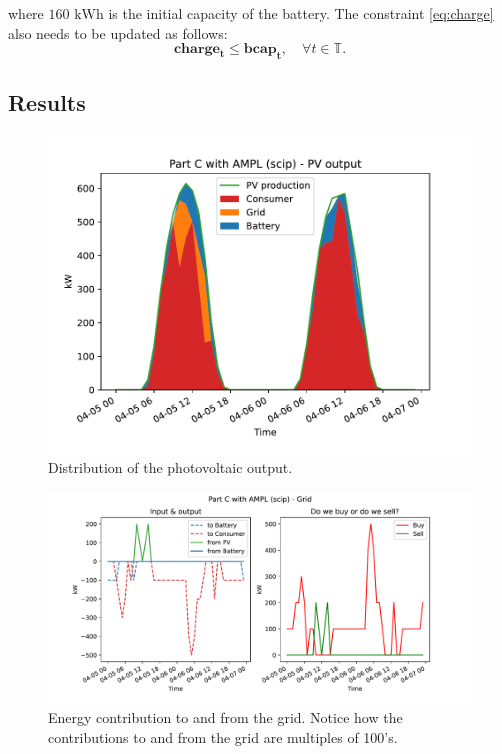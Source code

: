 \documentclass[12pt]{article}
\newcommand{\VAR}[1]{\mathbf{#1}}
\newcommand{\T}{\mathbb{T}}
\begin{document}
where \(160 \text{ kWh}\) is the initial capacity of the battery. The constraint \eqref{eq:charge} also needs to be updated as follows:
\begin{equation}
    \VAR{charge_t} \leq \VAR{bcap_t}, \quad \forall t \in \T.
    \label{eq:charge}
\end{equation}

\subsection{Results}
\begin{figure}[p]
    \centering
    \includegraphics[width=\textwidth]{PartC/pv_output}
    \caption{Distribution of the photovoltaic output.}
\end{figure}

\begin{figure}[p]
    \centering
    \includegraphics[width=\textwidth]{PartC/grid}
    \caption{Energy contribution to and from the grid. Notice how the contributions to and from the grid are multiples of 100's.}
\end{figure}
\end{document}

